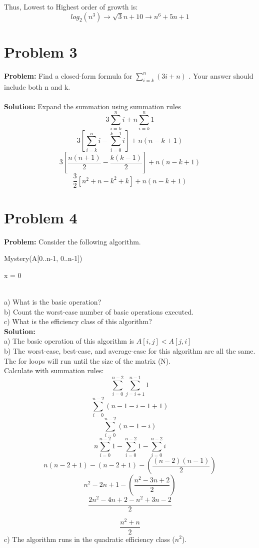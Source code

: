 \documentclass{article}
\begin{document}
Thus, Lowest to Highest order of growth is: \[log_2(n^3) \to \sqrt{3}{n} + 10 \to n^6 +5n +1\]

\section{Problem 3}
\textbf{Problem: }
Find a closed-form formula for $\sum_{i=k}^{n} (3i+n)$ . Your answer should include both n and k. \\
\\
\textbf{Solution: }
Expand the summation using summation rules
\[3 \sum_{i=k}^{n} i + n \sum_{i=k}^{n} 1 \]
\[3[\sum_{i=k}^{n}i - \sum_{i=0}^{k-1}i ] + n(n-k+1) \]
\[3[\frac{n(n+1)}{2} - \frac{k(k-1)}{2}] + n(n-k+1)\]
\[
\boxed
{\frac{3}{2}[n^2 + n - k^2 + k] + n(n-k+1)}
\]

\section{Problem 4}
\textbf{Problem: }
Consider the following algorithm.\\
\begin{algorithm}
\caption{Mystery(A[0..n-1, 0..n-1])}
x = 0 \\
\end{algorithm} \\
a) What is the basic operation? \\
b) Count the worst-case number of basic operations executed.\\
c) What is the efficiency class of this algorithm?\\
\textbf{Solution: }\\
a) The basic operation of this algorithm is $A[i,j] < A[j,i]$\\
b) The worst-case, best-case, and average-case for this algorithm are all the same. The for loops will run until the size of the matrix (N). \\
    Calculate with summation rules:
    \[\sum_{i=0}^{n-2} \sum_{j=i+1}^{n-1} 1\]
    \[\sum_{i=0}^{n-2} (n-1-i-1+1)\]
    \[\sum_{i=0}^{n-2} (n-1-i)\]
    \[n\sum_{i=0}^{n-2} 1 - \sum_{i=0}^{n-2} 1 - \sum_{i=0}^{n-2} i\]
    \[n(n-2+1) - (n-2+1) - (\frac{(n-2)(n-1)}{2})\]
    \[n^2 - 2n + 1 - (\frac{n^2 - 3n + 2}{2})\]
    \[\frac{2n^2 - 4n + 2 - n^2 + 3n - 2}{2}\]
    
    \[
    \boxed
    {\frac{n^2 + n}{2}}
    \]
c) The algorithm runs in the quadratic efficiency class ($n^2$).\\
\end{document}
